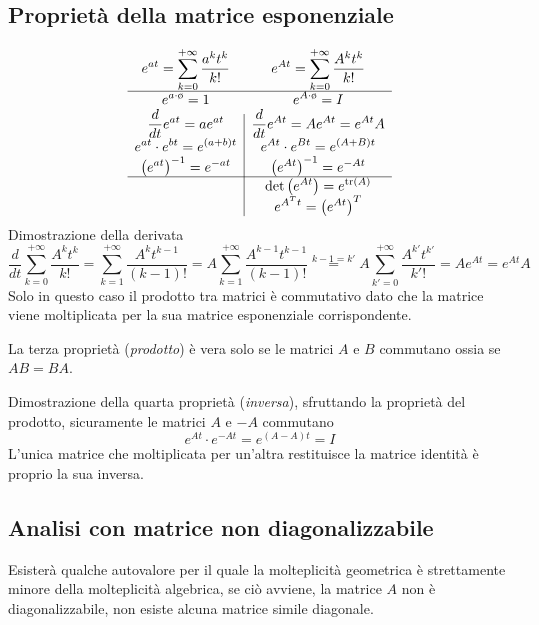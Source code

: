 \subsection{Proprietà della matrice esponenziale}
$$
\begin{array}{>{\displaystyle}c|>{\displaystyle}c}
 e^{at}=\sum_{k=0}^{+\infty} \frac{a^kt^k}{k!} & e^{At}=\sum_{k=0}^{+\infty}
\frac{A^k t^k}{k!} \\ \hline
e^{a\cdot \text{\o{}} } = 1 & e^{A\cdot \text{\o{}}} = I\\
\frac{d}{dt} e^{at} = ae^{at} & \frac{d}{dt} e^{At} = Ae^{At} = e^{At}A\\
e^{at}\cdot e^{bt} = e^{(a+b)t} & e^{At}\cdot e^{Bt} = e^{(A+B)t}\\
\left(e^{at}\right)^{-1} = e^{-at} & \left(e^{At}\right)^{-1} = e^{-At}\\
 \hline & \text{det}\left(e^{At}\right) =
e^{\text{tr}(A)}\\
 & e^{A^Tt} = \left(e^{At}\right)^T
\end{array}
$$
Dimostrazione della derivata
$$
\frac{d}{dt} \sum_{k=0}^{+\infty} \frac{A^kt^k}{k!} =
\sum_{k=1}^{+\infty}\frac{A^kt^{k-1}}{(k-1)!} =
A\sum_{k=1}^{+\infty} \frac{A^{k-1}t^{k-1}}{(k-1)!} \stackrel{k-1=k'}{=}
A\sum_{k'=0}^{+\infty}\frac{A^{k'}t^{k'}}{k'!} = Ae^{At} = e^{At}A
$$
Solo in questo caso il prodotto tra matrici è commutativo dato che la matrice
viene moltiplicata per la sua matrice esponenziale corrispondente.

La terza proprietà (\textit{prodotto}) è vera solo se le matrici $A$ e $B$
commutano ossia \linebreak se $AB = BA$.

Dimostrazione della quarta proprietà (\textit{inversa}), sfruttando la
proprietà del prodotto, sicuramente le matrici $A$ e $-A$ commutano
$$
e^{At} \cdot e^{-At} = e^{(A-A)t} = I
$$
L'unica matrice che moltiplicata per un'altra restituisce la matrice identità è
proprio la sua inversa.

\subsection{Analisi con matrice non diagonalizzabile}
Esisterà qualche autovalore per il quale la molteplicità geometrica è
strettamente minore della molteplicità algebrica, se ciò avviene, la matrice
$A$ non è diagonalizzabile, non esiste alcuna matrice simile diagonale.

